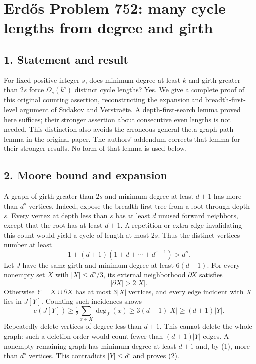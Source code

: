 \section*{Erd\H{o}s Problem 752: many cycle lengths from degree and girth}
\subsection*{1. Statement and result}
For fixed positive integer $s$, does minimum degree at least $k$ and girth greater than $2s$ force $\Omega_s(k^s)$ distinct cycle lengths? Yes. We give a complete proof of this original counting assertion, reconstructing the expansion and breadth-first-level argument of Sudakov and Verstra\"ete. A depth-first-search lemma proved here suffices; their stronger assertion about consecutive even lengths is not needed.
This distinction also avoids the erroneous general theta-graph path lemma in the original paper. The authors' addendum corrects that lemma for their stronger results. No form of that lemma is used below.
\subsection*{2. Moore bound and expansion}
A graph of girth greater than $2s$ and minimum degree at least $d+1$ has more than $d^s$ vertices. Indeed, expose the breadth-first tree from a root through depth $s$. Every vertex at depth less than $s$ has at least $d$ unused forward neighbors, except that the root has at least $d+1$. A repetition or extra edge invalidating this count would yield a cycle of length at most $2s$. Thus the distinct vertices number at least
\[
 1+(d+1)(1+d+\cdots+d^{s-1})>d^s. \tag{1}
\]
Let $J$ have the same girth and minimum degree at least $6(d+1)$. For every nonempty set $X$ with $|X|\le d^s/3$, its external neighborhood $\partial X$ satisfies
\[
 |\partial X|>2|X|. \tag{2}
\]
Otherwise $Y=X\cup\partial X$ has at most $3|X|$ vertices, and every edge incident with $X$ lies in $J[Y]$. Counting such incidences shows
\[
 e(J[Y])\ge\tfrac12\sum_{x\in X}\deg_J(x)
 \ge3(d+1)|X|\ge(d+1)|Y|.
\]
Repeatedly delete vertices of degree less than $d+1$. This cannot delete the whole graph: such a deletion order would count fewer than $(d+1)|Y|$ edges. A nonempty remaining graph has minimum degree at least $d+1$ and, by (1), more than $d^s$ vertices. This contradicts $|Y|\le d^s$ and proves (2).
